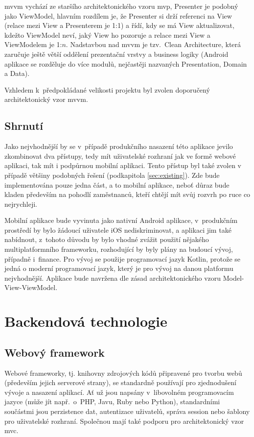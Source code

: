 \documentclass[a4paper,11pt,openany,twoside]{book}
\begin{document}
\acs{mvvm} vychází ze staršího architektonického vzoru \acs{mvp}, Presenter je podobný jako ViewModel, hlavním rozdílem je, že Presenter si drží referenci na View (relace mezi View a Presenterem je 1:1) a řídí, kdy se má View aktualizovat, kdežto ViewModel neví, jaký View ho pozoruje a relace mezi View a ViewModelem je 1:$n$. \cite{vogel2017android} Nadstavbou nad \acs{mvvm} je tzv.~Clean Architecture, která zaručuje ještě větší oddělení prezentační vrstvy a business logiky (Android aplikace se rozděluje do více modulů, nejčastěji nazvaných Presentation, Domain a Data). \cite{jain2019kotlin}

Vzhledem k~předpokládané velikosti projektu byl zvolen doporučený architektonický vzor \acs{mvvm}.

\subsection{Shrnutí}

Jako nejvhodnější by se v~případě produkčního nasazení této aplikace jevilo zkombinovat dva přístupy, tedy mít uživatelské rozhraní jak ve formě webové aplikaci, tak mít i podpůrnou mobilní aplikaci. Tento přístup byl také zvolen v případě většiny podobných řešení (podkapitola \ref{sec:existing}). Zde bude implementována pouze jedna část, a to mobilní aplikace, neboť důraz bude kladen především na pohodlí zaměstnanců, kteří chtějí mít svůj rozvrh po ruce co nejrychleji.

Mobilní aplikace bude vyvinuta jako nativní Android aplikace, v~produkčním prostředí by bylo žádoucí uživatele iOS nediskriminovat, a aplikaci jim také nabídnout, z~tohoto důvodu by bylo vhodné zvážit použití nějakého multiplatformního frameworku, rozhodující by byly plány na budoucí vývoj, případně i~finance. Pro vývoj se použije programovací jazyk Kotlin, protože se jedná o moderní programovací jazyk, který je pro vývoj na danou platformu nejvhodnější. Aplikace bude navržena dle zásad architektonického vzoru Model-View-ViewModel.


\section{Backendová technologie}

\subsection{Webový framework}

Webové frameworky, tj. knihovny zdrojových kódů připravené pro tvorbu webů (především jejich serverové strany), se standardně používají pro zjednodušení vývoje a nasazení aplikací. Ať už jsou napsány v~libovolném programovacím jazyce (může jít např.~o~PHP, Javu, Ruby nebo Python), standardními součástmi jsou perzistence dat, autentizace uživatelů, správa session nebo šablony pro uživatelské rozhraní. Společnou mají také podporu pro architektonický vzor \acs{mvc}. \cite{docforge2014web}
\end{document}
